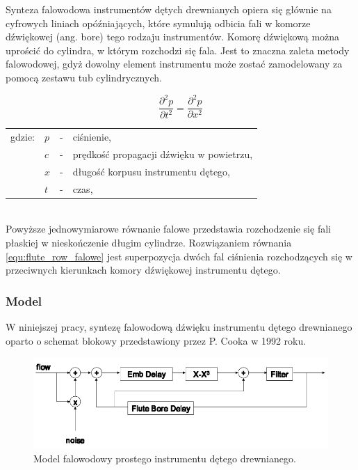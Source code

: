 Synteza falowodowa instrumentów dętych drewnianych opiera się głównie na cyfrowych liniach opóźniających, które symulują odbicia fali w komorze dźwiękowej (ang. bore) tego rodzaju instrumentów. Komorę dźwiękową można uprościć do cylindra, w którym rozchodzi się fala. Jest to znaczna zaleta metody falowodowej, gdyż dowolny element instrumentu może zostać zamodelowany za pomocą zestawu tub cylindrycznych.

\begin{equation} \label{equ:flute_row_falowe}
\frac{\partial^2 p}{\partial t^2} = \frac{\partial^2 p}{\partial x^2}
\end{equation}
\begin{tabular}{ l l l l}
	gdzie: 	&	$p$ & - &  ciśnienie, \\
	& $c$ &  - & prędkość propagacji dźwięku w powietrzu, \\
	&	$x$ & - &  długość korpusu instrumentu dętego,\\
	&	$t$ & - &  czas, \\
\end{tabular} \\

Powyższe jednowymiarowe równanie falowe przedstawia rozchodzenie się fali płaskiej w nieskończenie długim cylindrze. Rozwiązaniem równania \ref{equ:flute_row_falowe} jest superpozycja dwóch fal ciśnienia rozchodzących się w przeciwnych kierunkach komory dźwiękowej instrumentu dętego.


\subsubsection{Model}
W niniejszej pracy, syntezę falowodową dźwięku instrumentu dętego drewnianego oparto o schemat blokowy przedstawiony przez P. Cooka w 1992 roku.

\begin{figure}[H]
	\centering
	\includegraphics[width=14cm]{grafiki/flute_waveguide_mod}
	\captionsetup{justification=centering}
	\caption{Model falowodowy prostego instrumentu dętego drewnianego.}
	\label{rys:flute_cook}
\end{figure}

